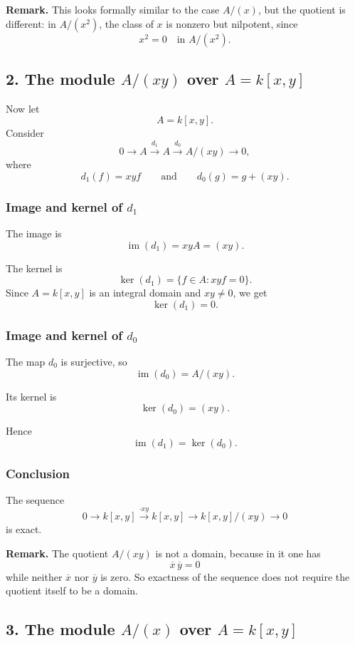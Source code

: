 \documentclass[12pt,a4paper]{article}
\theoremstyle{notespace}
\theoremstyle{definition}
\begin{document}
\medskip

\textbf{Remark.}
This looks formally similar to the case \(A/(x)\), but the quotient is different:
in \(A/(x^2)\), the class of \(x\) is nonzero but nilpotent, since
\[
x^2=0 \quad \text{in } A/(x^2).
\]

\subsection{2. The module \(A/(xy)\) over \(A=k[x,y]\)}

Now let
\[
A=k[x,y].
\]
Consider
\[
0 \longrightarrow A \xrightarrow{d_1} A \xrightarrow{d_0} A/(xy) \longrightarrow 0,
\]
where
\[
d_1(f)=xyf
\qquad\text{and}\qquad
d_0(g)=g+(xy).
\]

\subsubsection*{Image and kernel of \(d_1\)}

The image is
\[
\operatorname{im}(d_1)=xyA=(xy).
\]

The kernel is
\[
\ker(d_1)=\{f\in A : xyf=0\}.
\]
Since \(A=k[x,y]\) is an integral domain and \(xy\neq 0\), we get
\[
\ker(d_1)=0.
\]

\subsubsection*{Image and kernel of \(d_0\)}

The map \(d_0\) is surjective, so
\[
\operatorname{im}(d_0)=A/(xy).
\]

Its kernel is
\[
\ker(d_0)=(xy).
\]

Hence
\[
\operatorname{im}(d_1)=\ker(d_0).
\]

\subsubsection*{Conclusion}

The sequence
\[
0 \longrightarrow k[x,y] \xrightarrow{\cdot xy} k[x,y] \longrightarrow k[x,y]/(xy) \longrightarrow 0
\]
is exact.

\medskip

\textbf{Remark.}
The quotient \(A/(xy)\) is not a domain, because in it one has
\[
\overline{x}\,\overline{y}=0
\]
while neither \(\overline{x}\) nor \(\overline{y}\) is zero.
So exactness of the sequence does not require the quotient itself to be a domain.

\subsection{3. The module \(A/(x)\) over \(A=k[x,y]\)}
\end{document}
